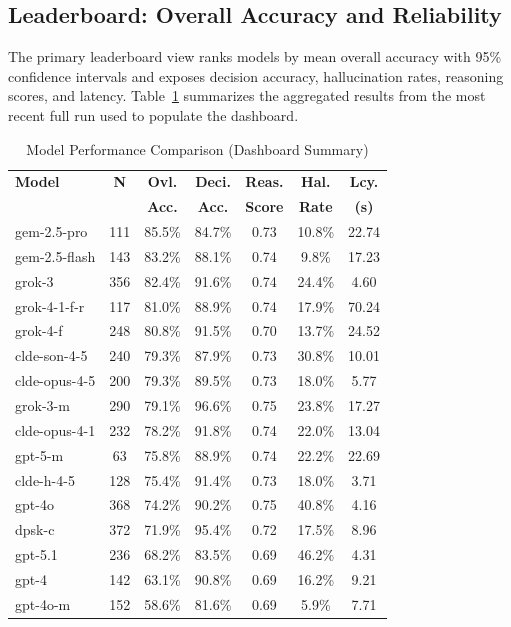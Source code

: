 \documentclass{article}
\begin{document}
\subsection{Leaderboard: Overall Accuracy and Reliability}

The primary leaderboard view ranks models by mean overall accuracy with 95\% confidence intervals and exposes decision accuracy, hallucination rates, reasoning scores, and latency. Table~\ref{tab1} summarizes the aggregated results from the most recent full run used to populate the dashboard.

\begin{table}[htbp]
\caption{Model Performance Comparison (Dashboard Summary)}
\begin{center}
\small
\begin{tabular}{lcccccc}
\toprule
\textbf{Model} & \textbf{N} & \textbf{Ovl.} & \textbf{Deci.} & \textbf{Reas.} & \textbf{Hal.} & \textbf{Lcy.} \\
      &  & \textbf{Acc.}    & \textbf{Acc.}     & \textbf{Score}     & \textbf{Rate}   & \textbf{(s)} \\
\midrule
gem-2.5-pro     & 111 & 85.5\%  & 84.7\% & 0.73 & 10.8\% & 22.74 \\
gem-2.5-flash   & 143 & 83.2\% & 88.1\% & 0.74 & 9.8\% & 17.23 \\
grok-3             & 356 & 82.4\%  & 91.6\% & 0.74 & 24.4\% & 4.60 \\
grok-4-1-f-r       & 117  & 81.0\%  & 88.9\% & 0.74 & 17.9\% & 70.24 \\
grok-4-f        & 248 & 80.8\%  & 91.5\% & 0.70 & 13.7\% & 24.52 \\
clde-son-4-5  & 240 & 79.3\%  & 87.9\% & 0.73 & 30.8\% & 10.01 \\
clde-opus-4-5    & 200 & 79.3\%  & 89.5\% & 0.73 & 18.0\% & 5.77 \\
grok-3-m       & 290 & 79.1\%  & 96.6\% & 0.75 & 23.8\% & 17.27 \\
clde-opus-4-1         & 232  & 78.2\%  & 91.8\% & 0.74 & 22.0\% & 13.04 \\
gpt-5-m         & 63  & 75.8\%  & 88.9\% & 0.74 & 22.2\% & 22.69 \\
clde-h-4-5   & 128  & 75.4\%  & 91.4\% & 0.73 & 18.0\% & 3.71 \\
gpt-4o             & 368 & 74.2\%  & 90.2\% & 0.75 & 40.8\% & 4.16 \\
dpsk-c      & 372 & 71.9\%  & 95.4\% & 0.72 & 17.5\% & 8.96 \\
gpt-5.1            & 236 & 68.2\%  & 83.5\% & 0.69 & 46.2\% & 4.31 \\
gpt-4              & 142 & 63.1\%  & 90.8\% & 0.69 & 16.2\% & 9.21 \\
gpt-4o-m        & 152 & 58.6\%  & 81.6\% & 0.69 & 5.9\% & 7.71 \\
\bottomrule
\end{tabular}
\label{tab1}
\end{center}
\end{table}
\end{document}
